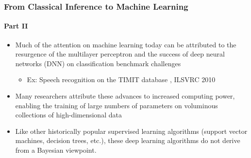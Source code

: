 \documentclass[aspectratio=169,usenames,dvipsnames]{beamer}
\begin{document}
\begin{frame}
\frametitle{From Classical Inference to Machine Learning}
\framesubtitle{Part II}

\begin{itemize}
\item Much of the attention on machine learning today can be attributed to the resurgence of the multilayer perceptron and the success of deep neural networks (DNN) on classification benchmark challenges 
\vspace{0.25em}
	\begin{itemize}
	\item Ex: Speech recognition on the TIMIT database , ILSVRC 2010 
	\end{itemize}
\vspace{0.5em}
\item Many researchers attribute these advances to increased \alert{computing power}, enabling the training of large numbers of parameters on voluminous collections of high-dimensional data
\vspace{0.5em}
\item Like other historically popular supervised learning algorithms (support vector machines, decision trees, etc.), these deep learning algorithms \alert{do not} derive from a Bayesian viewpoint. 

\end{itemize}

\end{frame}
 
\end{document}
